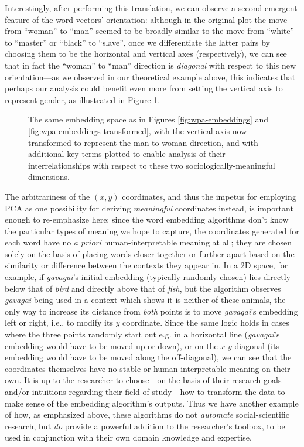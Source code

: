 \documentclass[11pt]{article}
\begin{document}
Interestingly, after performing this translation, we can observe a second emergent feature of the word vectors' orientation: although in the original plot the move from ``woman'' to ``man'' seemed to be broadly similar to the move from ``white'' to ``master'' or ``black'' to ``slave'', once we differentiate the latter pairs by choosing them to be the horizontal and vertical axes (respectively), we can see that in fact the ``woman'' to ``man'' direction is \textit{diagonal} with respect to this new orientation---as we observed in our theoretical example above, this indicates that perhaps our analysis could benefit even more from setting the vertical axis to represent gender, as illustrated in Figure \ref{fig:wpa-embeddings-gender}.

\begin{figure}[ht!]
\centering

\caption{The same embedding space as in Figures \ref{fig:wpa-embeddings} and \ref{fig:wpa-embeddings-transformed}, with the vertical axis now transformed to represent the man-to-woman direction, and with additional key terms plotted to enable analysis of their interrelationships with respect to these two sociologically-meaningful dimensions.}
\label{fig:wpa-embeddings-gender}
\end{figure}

The arbitrariness of the $(x,y)$ coordinates, and thus the impetus for employing PCA as one possibility for deriving \textit{meaningful} coordinates instead, is important enough to re-emphasize here: since the word embedding algorithms don't know the particular types of meaning we hope to capture, the coordinates generated for each word have no \textit{a priori} human-interpretable meaning at all; they are chosen solely on the basis of placing words closer together or further apart based on the similarity or difference between the contexts they appear in. In a 2D space, for example, if \textit{gavagai}'s initial embedding (typically randomly-chosen) lies directly below that of \textit{bird} and directly above that of \textit{fish}, but the algorithm observes \textit{gavagai} being used in a context which shows it is neither of these animals, the only way to increase its distance from \textit{both} points is to move \textit{gavagai}'s embedding left or right, i.e., to modify its $y$ coordinate. Since the same logic holds in cases where the three points randomly start out e.g. in a horizontal line (\textit{gavagai}'s embedding would have to be moved up or down), or on the $x$-$y$ diagonal (its embedding would have to be moved along the off-diagonal), we can see that the coordinates themselves have no stable or human-interpretable meaning on their own. It is up to the researcher to choose---on the basis of their research goals and/or intuitions regarding their field of study---how to transform the data to make sense of the embedding algorithm's outputs. Thus we have another example of how, as emphasized above, these algorithms do not \textit{automate} social-scientific research, but \textit{do} provide a powerful addition to the researcher's toolbox, to be used in conjunction with their own domain knowledge and expertise.
\end{document}
